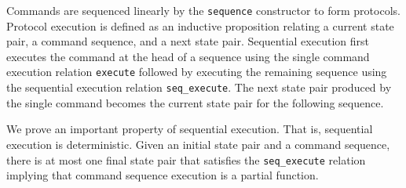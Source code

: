 \documentclass[runningheads]{llncs}
\begin{document}


Commands are sequenced linearly by the \verb|sequence| constructor to form
protocols. Protocol execution is defined as an inductive proposition
relating a current state pair, a command sequence, and a next state
pair. Sequential execution first executes the command at the head of a
sequence using the single command execution relation \verb|execute|
followed by executing the remaining sequence using the sequential
execution relation \verb|seq_execute|. The next state pair produced by
the single command becomes the current state pair for the following
sequence.


We prove an important property of sequential execution. That is,
sequential execution is deterministic. Given an initial state pair and
a command sequence, there is at most one final state pair that
satisfies the \verb|seq_execute| relation implying that command
sequence execution is a partial function. 
\end{document}
